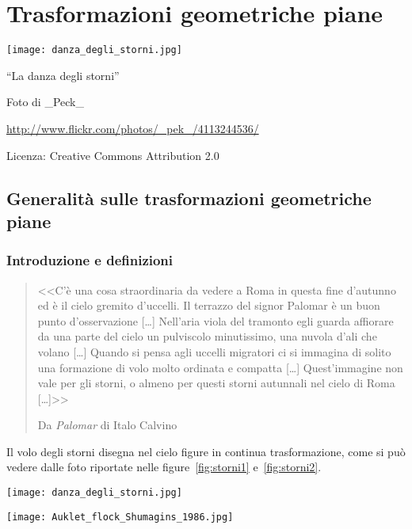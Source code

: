 \chapter{Trasformazioni geometriche piane}

\texttt{[image: danza\_degli\_storni.jpg]}
  \begin{center}
    {\large ``La danza degli storni''}\par
    Foto di \_Peck\_\par
    \url{http://www.flickr.com/photos/_pek_/4113244536/}\par
    Licenza: Creative Commons Attribution 2.0\par
  \end{center}
\newpage


\section{Generalità sulle trasformazioni geometriche piane}

\subsection{Introduzione e definizioni}

\begin{quote}
<<C'è una cosa straordinaria da vedere a Roma in questa fine d'autunno ed è il cielo gremito d'uccelli. Il terrazzo del signor Palomar è un buon punto d'osservazione [\ldots{}] Nell'aria viola del tramonto egli guarda affiorare da una parte del cielo un pulviscolo minutissimo, una nuvola d'ali che volano [\ldots{}] Quando si pensa agli uccelli migratori ci si immagina di solito una formazione di volo molto ordinata e compatta [\ldots{}] Quest'immagine non vale per gli storni, o almeno per questi storni autunnali nel cielo di Roma [\ldots{}]>>

\hfill{}Da \emph{Palomar} di Italo Calvino
\end{quote}

Il volo degli storni disegna nel cielo figure in continua trasformazione, come si può vedere dalle foto riportate nelle figure~\ref{fig:storni1} e~\ref{fig:storni2}.

\begin{figure*}[!htb]
\begin{center}
	\noindent\begin{minipage}{0.485\textwidth}
		\centering
		\texttt{[image: danza\_degli\_storni.jpg]}
		\caption{\emph{La danza degli storni}
			\protect\footnotemark}\label{fig:storni1}
	\end{minipage}
	\hspace{2mm}	
	\noindent\begin{minipage}{0.47\textwidth}
		\centering
		\texttt{[image: Auklet\_flock\_Shumagins\_1986.jpg]}
		\caption{\emph{Auklet flock, Shumagins 1986}\protect\footnotemark
			}\label{fig:storni2}
	\end{minipage}
\end{center}
\end{figure*}

